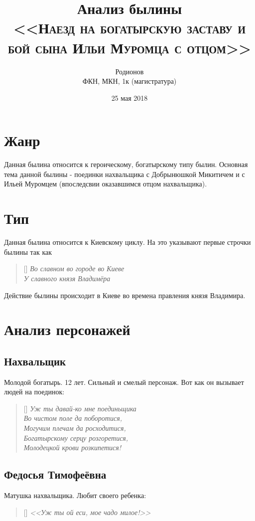 \documentclass[a4paper, 12pt]{article}
\title{Анализ былины\\\textbf{\scshape\Huge<<Наезд на богатырскую заставу и бой сына Ильи Муромца с отцом>>}}
\author{\Large{\scshapeАлександр Родионов}\\ФКН, МКН, 1к (магистратура)}
\date{25 мая 2018}
\begin{document}
\maketitle

\section{Жанр}
Данная былина относится к героическому, богатырскому типу былин. Основная тема данной былины - поединки нахвальщика с Добрынюшкой Микитичем и с Ильей Муромцем (впоследсвии оказавшимся отцом нахвальщика).


\section{Тип}
Данная былина относится к Киевскому циклу. На это указывают первые строчки былины так как 
\begin{verse}[\versewidth]
\itshape
Во славном во городе во Киеве\\
У славного князя Владимёра
\end{verse}


Действие былины происходит в Киеве во времена правления князя Владимира.

\section{Анализ персонажей}
\subsection{Нахвальщик}
Молодой богатырь. 12 лет. Сильный и смелый персонаж. Вот как он вызывает людей на поединок:
\begin{verse}[\versewidth]
\itshape
Уж ты давай-ко мне поединьщика\\
Во чистом поле да поборотися,\\
Могучим плечам да росходитися,\\
Богатырскому серцу розгоретися,\\
Молодецкой крови розкипетися!
\end{verse}


\subsection{Федосья Тимофеёвна}
Матушка нахвальщика. Любит своего ребенка:
\begin{verse}[\versewidth]
\itshape
<<Уж ты ой еси, мое чадо милое!>>
\end{verse}
\end{document}
